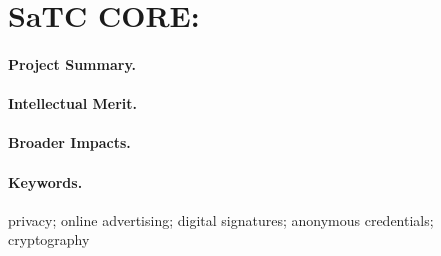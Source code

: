 \section*{SaTC CORE: \proptitle{}}
\label{sec:summary}

\paragraph{Project Summary.}
%

\paragraph{Intellectual Merit.}
%
%


\paragraph{Broader Impacts.}
%
%
%

\paragraph{Keywords.} privacy; online advertising; digital signatures; anonymous credentials; cryptography
